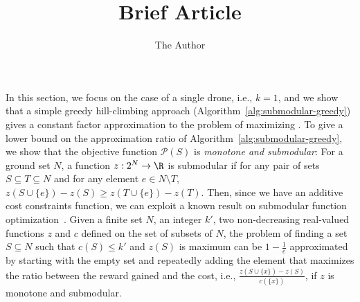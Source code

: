 \documentclass[11pt]{article} %
\title{Brief Article}
\author{The Author}
\begin{document}
In this section, we focus on the case of a single drone, i.e., \(k=1\), and we show that a simple greedy hill-climbing approach (Algorithm~\ref{alg:submodular-greedy}) gives a constant factor approximation to the problem of maximizing \prob.
To give a lower bound on the approximation ratio of Algorithm~\ref{alg:submodular-greedy}, we show that the objective function $\mathcal{P}(S)$ is \emph{monotone and submodular}: For a ground set $N$, a function $z:2^N\rightarrow \R$ is submodular if for any pair of sets $S\subseteq T \subseteq N$ and for any element $e\in N\setminus T$, $z(S\cup\{e\}) - z(S) \geq z(T\cup \{e\}) - z(T)$.
Then, since we have an additive cost constraints function, we can exploit a known result on submodular function optimization~\cite{sviridenko2004note}.
Given a finite set $N$, an integer $k'$, two non-decreasing real-valued functions $z$ and $c$ defined on the set of subsets of $N$, the problem of finding a set $S\subseteq N$ such that $c(S)\leq k'$ and $z(S)$ is maximum can be $1-\frac{1}{e}$ approximated by starting with the empty set and repeatedly adding the element that maximizes the ratio between the reward gained and the cost, i.e., \(\frac{z(S\cup\{x\}) - z(S)}{c(\{x\})}\), if $z$ is monotone and submodular.
\end{document}
